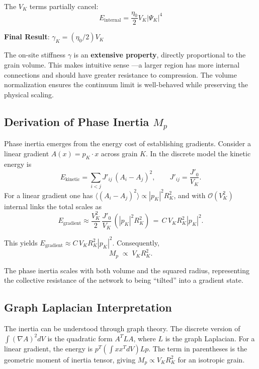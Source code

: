 \documentclass[11pt]{article}
\begin{document}
The $V_K$ terms partially cancel:
\begin{equation}
E_{\text{internal}} = \frac{\eta_0}{2} V_K |\Psi_K|^4
\end{equation}

\textbf{Final Result}: $\gamma_K = (\eta_0/2) V_K$

The on-site stiffness $\gamma$ is an \textbf{extensive property}, directly proportional to the grain volume. This makes intuitive sense —a larger region has more internal connections and should have greater resistance to compression. The volume normalization ensures the continuum limit is well-behaved while preserving the physical scaling.

\subsection{Derivation of Phase Inertia $M_p$}

Phase inertia emerges from the energy cost of establishing gradients. Consider a linear gradient $A(x) = p_K \cdot x$ across grain $K$. In the discrete model the kinetic energy is
\begin{equation}
E_{\text{kinetic}} = \sum_{i<j} J'_{ij}\,(A_i - A_j)^2,\qquad J'_{ij}=\frac{J'_0}{V_K}.
\end{equation}
For a linear gradient one has $\langle(A_i - A_j)^2\rangle \propto |p_K|^2 R_K^2$, and with $\mathcal O(V_K^2)$ internal links the total scales as
\begin{equation}
E_{\text{gradient}} \approx \frac{V_K^2}{2}\,\frac{J'_0}{V_K}\,(|p_K|^2 R_K^2) \,=\, C\, V_K R_K^2 |p_K|^2.
\end{equation}

This yields $E_{\text{gradient}} \approx C\, V_K R_K^2 |p_K|^2$. Consequently,
\begin{equation}
  M_p \;\propto\; V_K R_K^2.
\end{equation}

The phase inertia scales with both volume and the squared radius, representing the collective resistance of the network to being ``tilted'' into a gradient state.

\subsection{Graph Laplacian Interpretation}

The inertia can be understood through graph theory. The discrete version of $\int(\nabla A)^2dV$ is the quadratic form $A^T L A$, where $L$ is the graph Laplacian. For a linear gradient, the energy is $p^T (\int x x^T dV) L p$. The term in parentheses is the geometric moment of inertia tensor, giving $M_p \propto V_K R_K^2$ for an isotropic grain.
\end{document}
